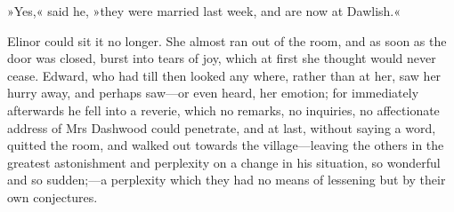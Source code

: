 »Yes,« said he, »they were married last week, and are now at Dawlish.«

Elinor could sit it no longer. She almost ran out of the room, and as soon as the door was closed, burst into tears of joy, which at first she thought would never cease. Edward, who had till then looked any where, rather than at her, saw her hurry away, and perhaps saw—or even heard, her emotion; for immediately afterwards he fell into a reverie, which no remarks, no inquiries, no affectionate address of Mrs Dashwood could penetrate, and at last, without saying a word, quitted the room, and walked out towards the village—leaving the others in the greatest astonishment and perplexity on a change in his situation, so wonderful and so sudden;—a perplexity which they had no means of lessening but by their own conjectures.